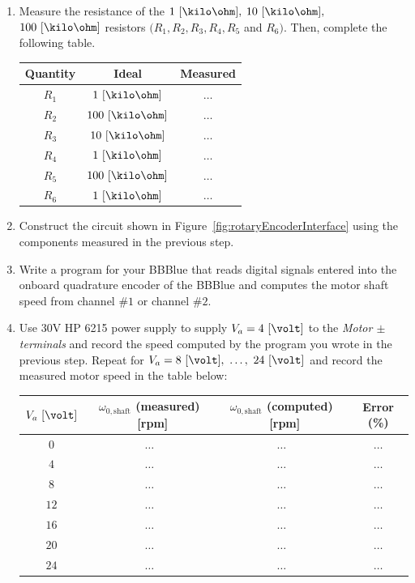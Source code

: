 \begin{enumerate}
\item Measure the resistance of the $1~[\kilo\ohm],$ $10~[\kilo\ohm],$ $100~[\kilo\ohm]$  resistors $(R_1,R_2,R_3,R_4,R_5$ and $R_6).$ Then, complete the following table.

  \begin{center}
    \begin{tabular}{c|c|c}
      \toprule
      Quantity &  Ideal & Measured\\
      \toprule
      $R_1$ & $1~[\kilo\ohm]$ & $\ldots$\\   %
      $R_2$ & $100~[\kilo\ohm]$ & $\ldots$\\   %
      $R_3$ & $10~[\kilo\ohm]$ & $\ldots$\\   %
      $R_4$ & $1~[\kilo\ohm]$ & $\ldots$\\   %
      $R_5$ & $100~[\kilo\ohm]$ & $\ldots$\\   %
      $R_6$ & $1~[\kilo\ohm]$ & $\ldots$\\   %
      \bottomrule
    \end{tabular}    
  \end{center}
  
\item Construct the circuit shown in Figure~\ref{fig:rotaryEncoderInterface} using the components measured in the previous step.

 
\item Write a program for your BBBlue  that reads digital signals entered into the onboard quadrature encoder  of the BBBlue and computes the motor shaft speed from channel $\#1$ or channel $\#2.$ 
\item Use $30$V HP 6215  power supply to supply $V_a=4~[\volt]$ to the \emph{Motor $\pm$  terminals}  and record the speed computed by the program you wrote in the previous step. Repeat for $V_a=8~[\volt],~\ldots,~24~[\volt]$ and record the measured motor speed in the table below: %
%
  \begin{center}
    \begin{tabular}{c|c|c|c}
      \toprule
      $V_a~[\volt]$ &  $\omega_{0,\mathrm{shaft}}$ (measured) ~[rpm]&  $\omega_{0,\mathrm{shaft}}$ (computed) ~[rpm] & Error (\%)\\
      \toprule
      $0$ & $\ldots$ & $\ldots$& $\ldots$\\
      $4$ & $\ldots$ & $\ldots$& $\ldots$ \\
      $8$ & $\ldots$ & $\ldots$& $\ldots$ \\
      $12$ & $\ldots$ & $\ldots$& $\ldots$ \\
      $16$ & $\ldots$ & $\ldots$& $\ldots$ \\
      $20$ & $\ldots$ & $\ldots$& $\ldots$ \\
      $24$ & $\ldots$ & $\ldots$& $\ldots$ \\
      \bottomrule
    \end{tabular}    
  \end{center}


\end{enumerate}
